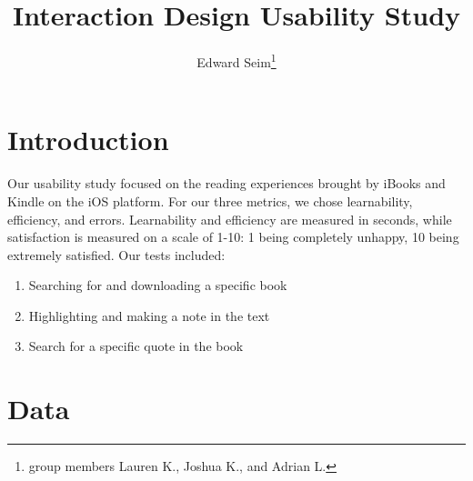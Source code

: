 \documentclass[journal,letterpaper]{article}
\title{Interaction Design Usability Study}
\author{Edward Seim\thanks{group members Lauren K., Joshua K., and Adrian L.}}
\begin{document}
    \maketitle
    
    \section{Introduction}
    \label{Introduction}

    Our usability study focused on the reading experiences brought by iBooks and Kindle on the iOS platform.
    For our three metrics, we chose learnability, efficiency, and errors. Learnability and efficiency are measured in seconds, while satisfaction is measured on a scale of 1-10: 1 being completely unhappy, 10 being extremely satisfied. Our tests included:

    \begin{enumerate}
        \item Searching for and downloading a specific book
        \item Highlighting and making a note in the text
        \item Search for a specific quote in the book
    \end{enumerate}

    \section{Data}
    \label{Data}
\end{document}
